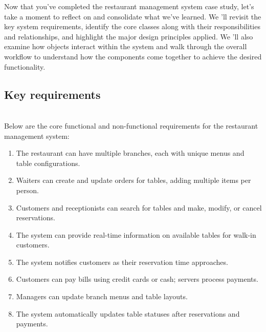 

Now that you've completed the restaurant management system case study, let's take a moment to reflect on and consolidate what we've learned. We 'll revisit the key system requirements, identify the core classes along with their responsibilities and relationships, and highlight the major design principles applied. We
'll also examine how objects interact within the system and walk through the overall workflow to understand how the components come together to achieve the desired functionality.

\subsection{Key requirements}\label{I1agLQT1CI1zGI8iYUzk0}
\\
Below are the core functional and non-functional requirements for the restaurant management system:

\begin{enumerate}
\item
\protect{}\label{8h8tyzT0EEMvbfnUL0kC0}
The restaurant can have multiple branches, each with unique menus and table configurations.
\item
\protect{}\label{0DoT77jH5Oz3O2Ay6Bp0v}
Waiters can create and update orders for tables, adding multiple items per person.
\item
\protect{}\label{joTJb4I8S29mujGnkI3op}
Customers and receptionists can search for tables and make, modify, or cancel reservations.
\item
\protect{}\label{T6mfV6-CcMCe2LNTskLbA}
The system can provide real-time information on available tables for walk-in customers.
\item
\protect{}\label{fsDHHAQdCDsE0skdoArl7}
The system notifies customers as their reservation time approaches.
\item
\protect{}\label{wxtqyMmBuclgqkbnuVeSk}
Customers can pay bills using credit cards or cash; servers process payments.
\item
\protect{}\label{LGUQRtMiLWjzvQxHAOhmi}
Managers can update branch menus and table layouts.
\item
\protect{}\label{m6F3DYy37b9zq-MaMtLGR}
The system automatically updates table statuses after reservations and payments.
\end{enumerate}


